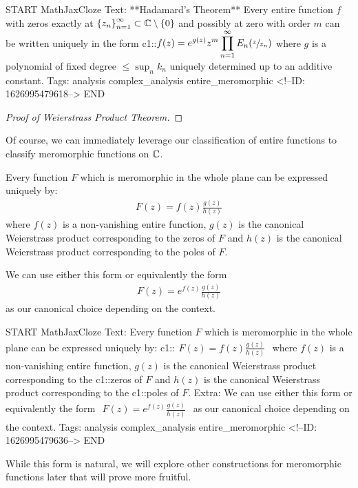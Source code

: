 \documentclass{memoir}
\begin{document}
\begin{anki}
START
MathJaxCloze
Text: **Hadamard's Theorem**
Every entire function \(f\) with zeros exactly at \(\left\{ z_n \right\}_{n=1}^{\infty}\subset \mathbb{C}\setminus\left\{ 0 \right\}\) and possibly at zero with order \(m\) can be written uniquely in the form
{{c1::\(\begin{align*}
      	f(z) = e^{g(z)} z^{m} \prod_{n=1}^{\infty} E_n( \sfrac{z}{z_n})
        \end{align*}\)}}
where \(g\) is a polynomial of fixed degree \(\leq \sup_{n} k_n\) uniquely determined up to an additive constant.
Tags: analysis complex_analysis entire_meromorphic
<!--ID: 1626995479618-->
END
\end{anki}


\begin{proof}[Proof of Weierstrass Product Theorem]
	
\end{proof}

Of course, we can immediately leverage our classification of entire functions to classify meromorphic functions on \(\mathbb{C}\).

\begin{cor}
	Every function \(F\) which is meromorphic in the whole plane can be expressed uniquely by:
	\begin{align*}
		F(z) = f(z)\frac{g(z)}{h(z)}
	\end{align*}
	where \(f(z)\) is a non-vanishing entire function, \(g(z)\) is the canonical Weierstrass product corresponding to the zeros of \(F\) and \(h(z)\) is the canonical Weierstrass product corresponding to the poles of \(F\).
\end{cor}
We can use either this form or equivalently the form
\begin{align*}
	F(z) = e^{f(z)} \frac{g(z)}{h(z)}
\end{align*}
as our canonical choice depending on the context.

\begin{anki}
START
MathJaxCloze
Text: Every function \(F\) which is meromorphic in the whole plane can be expressed uniquely by:
{{c1::\(\begin{align*}
        	F(z) = f(z)\frac{g(z)}{h(z)}
        \end{align*}\)}} 
where \(f(z)\) is a non-vanishing entire function, \(g(z)\) is the canonical Weierstrass product corresponding to the {{c1::zeros of \(F\)}} and \(h(z)\) is the canonical Weierstrass product corresponding to the {{c1::poles of \(F\)}}.
Extra: We can use either this form or equivalently the form
\(\begin{align*}
  	F(z) = e^{f(z)} \frac{g(z)}{h(z)}
  \end{align*}\)
as our canonical choice depending on the context.
Tags: analysis complex_analysis entire_meromorphic
<!--ID: 1626995479636-->
END
\end{anki}
While this form is natural, we will explore other constructions for meromorphic functions later that will prove more fruitful.\\
\end{document}
